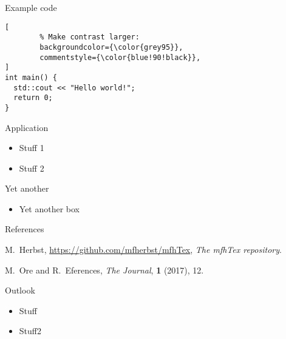\documentclass[fontscale=0.34]{MFHposter}
\begin{document}
\begin{mfhposter}
\begin{posterbox}[below=another,above=bottom]{Example code}
\begin{flushright}
\begin{minipage}{0.97\textwidth}
\begin{lstlisting}[
		% Make contrast larger:
		backgroundcolor={\color{grey95}},
		commentstyle={\color{blue!90!black}},
]
int main() {
  std::cout << "Hello world!";
  return 0;
}
\end{lstlisting}
\end{minipage}
\end{flushright}
\end{posterbox}

%
%
\begin{posterbox}[name=application,column=1,row=0]{Application}
	\vspace{5cm}
	\begin{itemize}
		\item Stuff 1
		\item Stuff 2
	\end{itemize}
	\vspace{5cm}
\end{posterbox}

\begin{posterbox}[name=yet,column=1,below=application]{Yet another}
	\vspace{2cm}
	\begin{itemize}
		\item Yet another box
	\end{itemize}
	\vspace{2cm}
\end{posterbox}

\begin{posterbox}[name=references,column=1,above=bottom]{References}

\vspace{-1.0em}
\smaller[2]

\begin{thebibliography}{2}
	M.~Herbst, \url{https://github.com/mfherbst/mfhTex}, \textit{The mfhTex repository}.

	M.~Ore and R.~Eferences, \textit{The Journal}, \textbf{1} (2017), 12.
\end{thebibliography}
\end{posterbox}

\begin{posterbox}[name=outlook,column=1,below=yet,above=references]{Outlook}
\begin{itemize}
	\compresslist
	\item Stuff
	\item Stuff2
\end{itemize}
\end{posterbox}

\end{mfhposter}
\end{document}
